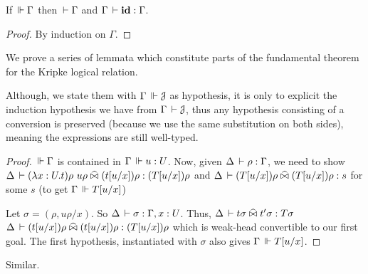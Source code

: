\documentclass[a4paper,english]{lipics-utf8x}
\begin{document}
  \begin{lemma}
    If $\,\Vdash \Gamma$ then $\,\vdash \Gamma$ and $\Gamma \,\vdash \operatorname{\mathbf{id}} : \Gamma$.
  \end{lemma}

  \begin{proof}
    By induction on $\Gamma$.
  \end{proof}

  We prove a series of lemmata which constitute parts of the fundamental theorem
  for the Kripke logical relation.

  Although, we state them with $\Gamma \,\Vdash \mathcal{J}$ as hypothesis,
  it is only to explicit the induction hypothesis we have from
  $\Gamma \,\vdash \mathcal{J}$, thus any hypothesis consisting of a conversion
  is preserved (because we use the same substitution on both sides),
  meaning the expressions are still well-typed.

  \begin{lemma}
    \leavevmode
    \begin{mathc}
    \end{mathc}
  \end{lemma}

  \begin{proof}
    $\,\Vdash \Gamma$ is contained in $\Gamma \,\Vdash u : U$.
    Now, given $\Delta \,\vdash \rho : \Gamma$, we need to show
    $\Delta \der (\lambda x:U.t)\rho\ u\rho \hEr (t[u/x])\rho : (T[u/x])\rho$
    and $\Delta \,\vdash (T[u/x])\rho \mathrel{\widehat{\bowtie}} (T[u/x])\rho : s$ for some $s$
    (to get $\Gamma \,\Vdash T[u/x]$)

    Let $\sigma = (\rho, u \rho/x)$.
    So $\Delta \,\vdash \sigma : \Gamma, x:U$.
    Thus, $\Delta \,\vdash t \sigma \mathrel{\widehat{\bowtie}} t' \sigma : T\sigma$
    \ie $\Delta \,\vdash (t[u/x])\rho \mathrel{\widehat{\bowtie}} (t[u/x])\rho : (T[u/x])\rho$
    which is weak-head convertible to our first goal.
    The first hypothesis, instantiated with $\sigma$ also gives
    $\Gamma \,\Vdash T[u/x]$.
  \end{proof}

  \begin{lemma}
    \leavevmode
    \begin{mathc}
    \end{mathc}
  \end{lemma}
  Similar.
\end{document}
